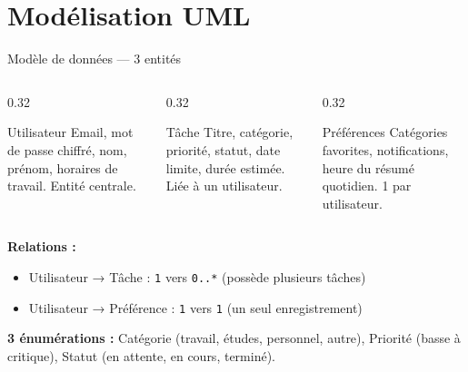 \documentclass[aspectratio=169, 10pt]{beamer}
\begin{document}
\section{Modélisation UML}

\begin{frame}{Modèle de données — 3 entités}
\begin{columns}[T]
\begin{column}{0.32\textwidth}
\begin{block}{Utilisateur}
\scriptsize
Email, mot de passe chiffré, nom, prénom, horaires de travail. Entité centrale.
\end{block}
\end{column}
\begin{column}{0.32\textwidth}
\begin{block}{Tâche}
\scriptsize
Titre, catégorie, priorité, statut, date limite, durée estimée. Liée à un utilisateur.
\end{block}
\end{column}
\begin{column}{0.32\textwidth}
\begin{block}{Préférences}
\scriptsize
Catégories favorites, notifications, heure du résumé quotidien. 1 par utilisateur.
\end{block}
\end{column}
\end{columns}
\vspace{0.3cm}
\small\textbf{\textcolor{secondary}{Relations :}}
\begin{itemize}\small
    \item Utilisateur → Tâche : \texttt{1} vers \texttt{0..*} (possède plusieurs tâches)
    \item Utilisateur → Préférence : \texttt{1} vers \texttt{1} (un seul enregistrement)
\end{itemize}
\vspace{0.2cm}
\small\textbf{\textcolor{secondary}{3 énumérations :}} Catégorie (travail, études, personnel, autre), Priorité (basse à critique), Statut (en attente, en cours, terminé).
\end{frame}
\end{document}
